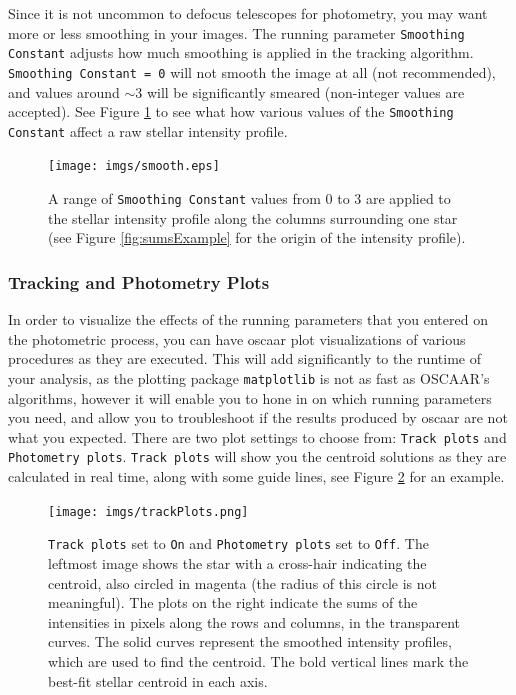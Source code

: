 \documentclass[a4paper]{article}
\newcommand{\code}[1]{\texttt{#1}}
\begin{document}
Since it is not uncommon to defocus telescopes for photometry, you may want more or less smoothing in your images. The running parameter \code{Smoothing Constant} adjusts how much smoothing is applied in the tracking algorithm. \code{Smoothing Constant = 0} will not smooth the image at all (not recommended), and values around $\sim3$ will be significantly smeared (non-integer values are accepted). See Figure \ref{fig:smoothExample} to see what how various values of the \code{Smoothing Constant} affect a raw stellar intensity profile.
\begin{figure}[H]
\begin{center}
\texttt{[image: imgs/smooth.eps]}
\caption{A range of \code{Smoothing Constant} values from 0 to 3 are applied to the stellar intensity profile along the columns surrounding one star (see Figure \ref{fig:sumsExample} for the origin of the intensity profile).}
\label{fig:smoothExample}
\end{center}	
\end{figure}

\subsubsection{Tracking and Photometry Plots} \label{sec:trackandphotplots}
In order to visualize the effects of the running parameters that you entered on the photometric process, you can have oscaar plot visualizations of various procedures as they are executed. This will add significantly to the runtime of your analysis, as the plotting package \code{matplotlib} is not as fast as OSCAAR's algorithms, however it will enable you to hone in on which running parameters you need, and allow you to troubleshoot if the results produced by oscaar are not what you expected. There are two plot settings to choose from: \code{Track plots} and \code{Photometry plots}.  \code{Track plots} will show you the centroid solutions as they are calculated in real time, along with some guide lines, see Figure \ref{fig:trackingExamples} for an example. 

\begin{figure}[H]
\begin{center}
\texttt{[image: imgs/trackPlots.png]}
\caption{\code{Track plots} set to \code{On} and \code{Photometry plots} set to \code{Off}. The leftmost image shows the star with a cross-hair indicating the centroid, also circled in magenta (the radius of this circle is not meaningful). The plots on the right indicate the sums of the intensities in pixels along the rows and columns, in the transparent curves. The solid curves represent the smoothed intensity profiles, which are used to find the centroid. The bold vertical lines mark the best-fit stellar centroid in each axis.}
\label{fig:trackingExamples}
\end{center}	
\end{figure}
\end{document}
